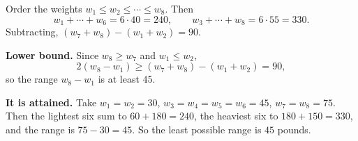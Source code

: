 Order the weights $w_1\le w_2\le\cdots\le w_8$. Then
\[
w_1+\cdots+w_6=6\cdot40=240,\qquad w_3+\cdots+w_8=6\cdot55=330 .
\]
Subtracting, $(w_7+w_8)-(w_1+w_2)=90$.

\textbf{Lower bound.} Since $w_8\ge w_7$ and $w_1\le w_2$,
\[
2(w_8-w_1)\ge(w_7+w_8)-(w_1+w_2)=90,
\]
so the range $w_8-w_1$ is at least $45$.

\textbf{It is attained.} Take $w_1=w_2=30$, $w_3=w_4=w_5=w_6=45$, $w_7=w_8=75$. Then the lightest six sum to $60+180=240$, the heaviest six to $180+150=330$, and the range is $75-30=45$. So the least possible range is $\boxed{45}$ pounds.
